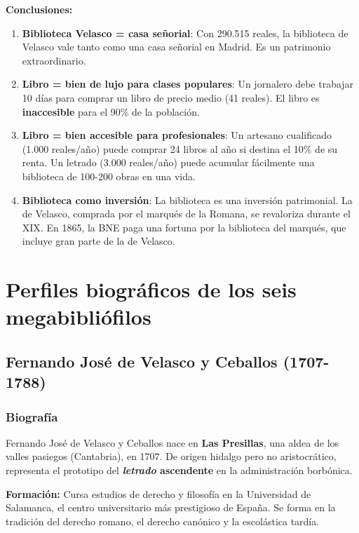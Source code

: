 \documentclass[11pt,a4paper]{article}
\begin{document}
\textbf{Conclusiones:}

\begin{enumerate}
\item \textbf{Biblioteca Velasco = casa señorial}: Con 290.515 reales, la biblioteca de Velasco vale tanto como una casa señorial en Madrid. Es un patrimonio extraordinario.

\item \textbf{Libro = bien de lujo para clases populares}: Un jornalero debe trabajar 10 días para comprar un libro de precio medio (41 reales). El libro es \textbf{inaccesible} para el 90\% de la población.

\item \textbf{Libro = bien accesible para profesionales}: Un artesano cualificado (1.000 reales/año) puede comprar 24 libros al año si destina el 10\% de su renta. Un letrado (3.000 reales/año) puede acumular fácilmente una biblioteca de 100-200 obras en una vida.

\item \textbf{Biblioteca como inversión}: La biblioteca es una inversión patrimonial. La de Velasco, comprada por el marqués de la Romana, se revaloriza durante el XIX. En 1865, la BNE paga una fortuna por la biblioteca del marqués, que incluye gran parte de la de Velasco.
\end{enumerate}

\section{Perfiles biográficos de los seis megabibliófilos}

\subsection{Fernando José de Velasco y Ceballos (1707-1788)}

\subsubsection{Biografía}

Fernando José de Velasco y Ceballos nace en \textbf{Las Presillas}, una aldea de los valles pasiegos (Cantabria), en 1707. De origen hidalgo pero no aristocrático, representa el prototipo del \textbf{\textit{letrado} ascendente} en la administración borbónica.

\textbf{Formación:} Cursa estudios de derecho y filosofía en la Universidad de Salamanca, el centro universitario más prestigioso de España. Se forma en la tradición del derecho romano, el derecho canónico y la escolástica tardía.
\end{document}

